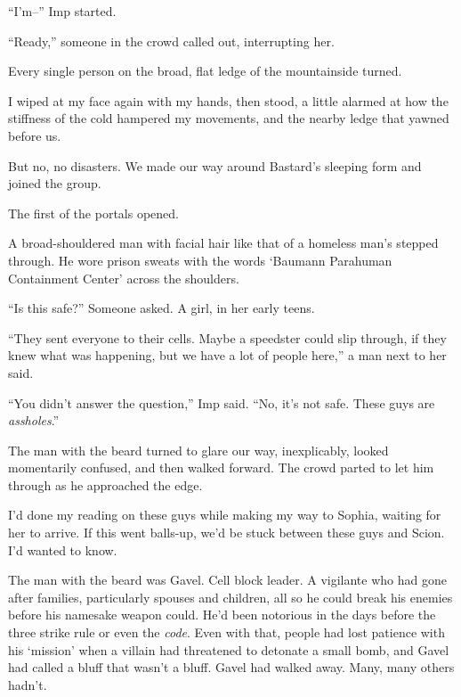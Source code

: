 ``I'm--'' Imp started.



``Ready,'' someone in the crowd called out, interrupting her.



Every single person on the broad, flat ledge of the mountainside turned.



I wiped at my face again with my hands, then stood, a little alarmed at how the stiffness of the cold hampered my movements, and the nearby ledge that yawned before us.



But no, no disasters.  We made our way around Bastard's sleeping form and joined the group.



The first of the portals opened.



A broad-shouldered man with facial hair like that of a homeless man's stepped through.  He wore prison sweats with the words `Baumann Parahuman Containment Center' across the shoulders.



``Is this safe?''  Someone asked.  A girl, in her early teens.



``They sent everyone to their cells.  Maybe a speedster could slip through, if they knew what was happening, but we have a lot of people here,'' a man next to her said.



``You didn't answer the question,'' Imp said.  ``No, it's not safe.  These guys are \emph{assholes}.''



The man with the beard turned to glare our way, inexplicably, looked momentarily confused, and then walked forward.  The crowd parted to let him through as he approached the edge.



I'd done my reading on these guys while making my way to Sophia, waiting for her to arrive.  If this went balls-up, we'd be stuck between these guys and Scion.  I'd wanted to know.



The man with the beard was Gavel.  Cell block leader.  A vigilante who had gone after families, particularly spouses and children, all so he could break his enemies before his namesake weapon could.  He'd been notorious in the days before the three strike rule or even the \emph{code}.  Even with that, people had lost patience with his `mission' when a villain had threatened to detonate a small bomb, and Gavel had called a bluff that wasn't a bluff.  Gavel had walked away.  Many, many others hadn't.



